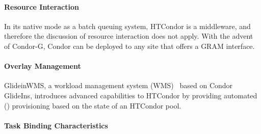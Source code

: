 \documentclass{sig-alternate}
\begin{document}

\paragraph{Resource Interaction}

In its native mode as a batch queuing system, HTCondor is a middleware, and
therefore the discussion of resource interaction does not apply. With the
advent of Condor-G, Condor can be deployed to any site that offers a GRAM
interface.

\paragraph{Overlay Management}


GlideinWMS, a workload management system (WMS)~\cite{1742-6596-119-6-062044}
based on Condor GlideIns, introduces advanced \pilot capabilities to HTCondor
by providing automated \pilot () provisioning based on the
state of an HTCondor pool.


\paragraph{Task Binding Characteristics}

\end{document}
